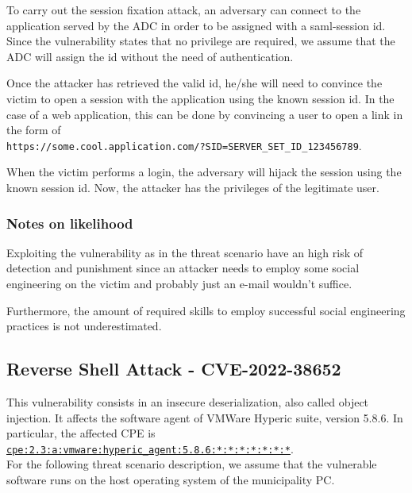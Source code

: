 To carry out the session fixation attack, an adversary can connect to the application served by the ADC in order to be assigned with a saml-session id. Since the vulnerability states that no privilege are required, we assume that the ADC will assign the id without the need of authentication.

Once the attacker has retrieved the valid id, he/she will need to convince the victim to open a session with the application using the known session id. In the case of a web application, this can be done by convincing a user to open a link in the form of \\ \texttt{https://some.cool.application.com/?SID=SERVER\_SET\_ID\_123456789}.

When the victim performs a login, the adversary will hijack the session using the known session id.\cite{article:kolsek2002session} Now, the attacker has the privileges of the legitimate user.

\subsubsection*{Notes on likelihood}

Exploiting the vulnerability as in the threat scenario have an high risk of detection and punishment since an attacker needs to employ some social engineering on the victim and probably just an e-mail wouldn't suffice.

Furthermore, the amount of required skills to employ successful social engineering practices is not underestimated.

\subsection*{Reverse Shell Attack - CVE-2022-38652}

This vulnerability consists in an insecure deserialization, also called object injection. It affects the software agent of VMWare Hyperic suite, version 5.8.6. In particular, the affected CPE is \\ \href{https://nvd.nist.gov/products/cpe/detail/5976A94C-7191-4547-8205-494B8379A0A3?namingFormat=2.3&orderBy=CPEURI&keyword=cpe%3A2.3%3Aa%3Avmware%3Ahyperic_agent%3A5.8.6%3A*%3A*%3A*%3A*%3A*%3A*%3A*&status=FINAL%2CDEPRECATED}{\texttt{cpe:2.3:a:vmware:hyperic\_agent:5.8.6:*:*:*:*:*:*:*}}.\\

For the following threat scenario description, we assume that the vulnerable software runs on the host operating system of the municipality PC.

